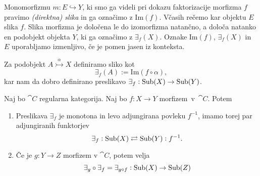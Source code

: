 \documentclass[../kategoricna_logika.tex]{subfiles}
\begin{document}
\begin{definicija}
  Monomorfizmu $m : E \hookrightarrow Y$, ki smo ga videli pri dokazu
  faktorizacije morfizma $f$ pravimo \emph{(direktna) slika} in ga
  označimo z $\mathrm{Im}(f)$.  Včasih rečemo kar objektu $E$ slika
  $f$. Slika morfizma je določena le do izomorfizma natančno, a določa
  natanko en podobjekt objekta $Y$, ki ga označimo z $\exists_f(X)$.
  Oznake $\mathrm{Im}(f)$, $\exists_f(X)$ in $E$ uporabljamo
  izmenljivo, če je pomen jasen iz konteksta.

  Za podobjekt $A \overset{\alpha}{\rightarrowtail} X$ definiramo
  sliko kot
$$\exists_f(A) := \mathrm{Im}(f \circ \alpha),$$
kar nam da dobro definirano preslikavo
$\exists_f : \operatorname{Sub}(X) \to \operatorname{Sub}(Y)$.
\end{definicija}
\begin{comment}
  Če se malo poigramo s temi slikami, dobimo diagram
  \begin{equation*}
    \begin{tikzcd}
      A \times_Y A \ar[d, shift left , "a_1"] \ar[d, shift right, "a_2"'] \ar[r, dashed, "u"] &
      X \times_Y X \ar[d, shift left, "p_1"] \ar[d, shift right, "p_2"'] & \\
      A \ar[d, two heads, "a"] \ar[r, tail, "\alpha"] & X \ar[dr, "f"] \ar[r, two heads, "q"] &
      \exists_f X \ar[d, tail, "m"] \\
      \exists_f A \ar[rr, tail] \ar[urr, dashed, "\dot{\imath}"] & & Y
    \end{tikzcd}
  \end{equation*}
  iz katerega lahko zaradi enoličnosti slik (do izomorfizma natančno)
  razberemo, da je $\dot{\imath}$ monomorfizem.
\end{comment}
\begin{lema}
  Naj bo $\cat{C}$ regularna kategorija. Naj bo $f : X \to Y$
  morfizem~v~$\cat{C}$. Potem
  \begin{enumerate}[label=(\roman*)]
  \item Preslikava $\exists_f$ je monotona in levo adjungirana povleku
    $f^{-1}$, imamo torej par adjungiranih funktorjev
    $$\exists_f : \operatorname{Sub}(X) \rightleftarrows \operatorname{Sub}(Y) : f^{-1}.$$
  \item Če je $g : Y \to Z$ morfizem v $\cat{C}$, potem
    velja
    $$\exists_g \circ \exists_f = \exists_{g \circ f} : \operatorname{Sub}(X) \to
    \operatorname{Sub}(Z)$$
  \end{enumerate}
\end{lema}
\end{document}

